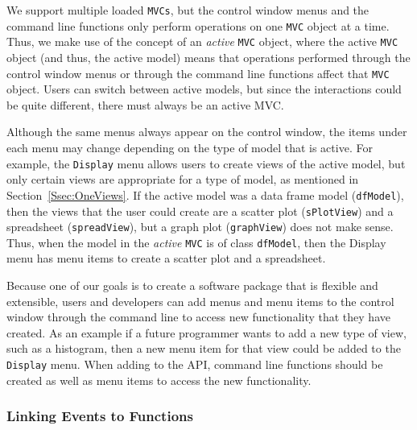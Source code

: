 \documentclass[11pt]{article}
\newcommand{\Robject}[1]{{\texttt{#1}}}
\newcommand{\Rclass}[1]{\texttt{#1}}
\begin{document}


We support multiple loaded \Robject{MVCs}, but the control window menus
and the command line functions only perform operations on one
\Robject{MVC} object at a time.  Thus, we make use of the concept of
an \textit{active} \Robject{MVC} object, where the active
\Robject{MVC} object (and thus, the active model) means that
operations performed through the control window menus or through the
command line functions affect that \Robject{MVC} object. Users can
switch between active models, but since the interactions could be
quite different, there must always be an active MVC. 

Although the same menus always appear on the control window,
the items under each menu may change depending on the type of model
that is active.  For example, the \texttt{Display} menu allows users
to create views of the active model, but only certain views are
appropriate for a type of model, as mentioned in
Section~\ref{Ssec:OneViews}.  If the active model was a data frame
model (\Rclass{dfModel}), then the views that the user could create
are a scatter plot (\Rclass{sPlotView}) and a spreadsheet
(\Rclass{spreadView}), but a graph plot (\Rclass{graphView}) does not
make sense.  Thus, when the model in the \textit{active} \Robject{MVC} is
of class \Rclass{dfModel}, then the Display menu has menu items to
create a scatter plot and a spreadsheet.

Because one of our goals is to create a software package that is
flexible and extensible, users and developers can add menus and menu items 
to the control window through the command line to access new
functionality that they have created.  As an example if a future
programmer wants to add a new type of view, such as a histogram, then
a new menu item for that view could be added to the \texttt{Display}
menu.  When adding to the API, command line functions should be created as
well as menu items to access the new functionality.

\subsubsection{Linking Events to Functions}
\label{Ssec:OneEvent}
\end{document}
